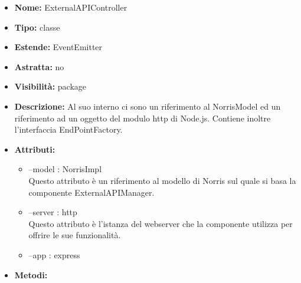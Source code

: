 			
			\begin{itemize}
			\item \textbf{Nome:} ExternalAPIController
			\item \textbf{Tipo:} classe
			
		\item \textbf{Estende:}
		EventEmitter
		\item \textbf{Astratta:}
		no
			\item \textbf{Visibilità:} package
			\item \textbf{Descrizione:} Al suo interno ci sono un riferimento al NorrisModel ed un riferimento ad un oggetto del modulo http di Node.js. Contiene inoltre l'interfaccia EndPointFactory.
			\item \textbf{Attributi:}
				\begin{itemize}
				\setlength{\itemsep}{5pt}
				
					\item[\ding{111}] {--model : NorrisImpl} \\ [1mm] Questo attributo è un riferimento al modello di Norris sul quale si basa la componente ExternalAPIManager.
					\item[\ding{111}] {--server : http} \\ [1mm] Questo attributo è l'istanza del webserver che la componente utilizza per offrire le sue funzionalità.
					\item[\ding{111}] {--app : express}
				\end{itemize}
		
			\item \textbf{Metodi:}
				\begin{itemize}
				\setlength{\itemsep}{5pt}
				

\end{itemize}
\end{itemize}

